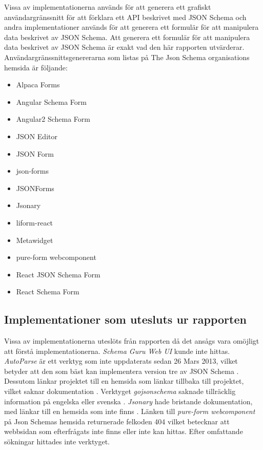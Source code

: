 Vissa av implementationerna används för att generera ett grafiskt användargränssnitt för att förklara ett API beskrivet med JSON Schema och andra implementationer används för att generera ett formulär för att manipulera data beskrivet av JSON Schema. Att generera ett formulär för att manipulera data beskrivet av JSON Schema är exakt vad den här rapporten utvärderar. Användargränssnittsgenererarna som listas på The Json Schema organisations hemsida är följande:

\begin{itemize}
	\item Alpaca Forms \cite{GitanaSoftwareInc.}
	\item Angular Schema Form \cite{Textalk}
	\item Angular2 Schema Form \cite{MakinaCorpus}
	\item JSON Editor \cite{JeremyDorn}
	\item JSON Form \cite{Joshfire}
	\item json-forms \cite{Brutusin.org}
	\item JSONForms  \cite{EclipseSource}
	\item Jsonary \cite{Jsonary-js}
	\item liform-react \cite{NachoMartin}
	\item Metawidget \cite{Metawidget}
	\item pure-form webcomponent
	\item React JSON Schema Form \cite{MozillaServices}
	\item React Schema Form \cite{NetworkNewTechnologiesInc.}
\end{itemize}

\subsection{Implementationer som utesluts ur rapporten}

Vissa av implementationerna uteslöts från rapporten då det ansågs vara omöjligt att förstå implementationerna. \textit{Schema Guru Web UI} kunde inte hittas. \textit{AutoParse} är ett verktyg som inte uppdaterats sedan 26 Mars 2013, vilket betyder att den som bäst kan implementera version tre av JSON Schema \cite{Googleb}. Dessutom länkar projektet till en hemsida som länkar tillbaka till projektet, vilket saknar dokumentation \cite{Googleb}. Verktyget \textit{gojsonschema} saknade tillräcklig information på engelska eller svenska \cite{Zhangtao}. \textit{Jsonary} hade bristande dokumentation, med länkar till en hemsida som inte finns \cite{Jsonary-js}. Länken till \textit{pure-form webcomponent} på Json Schemas hemsida returnerade felkoden 404 vilket betecknar att webbsidan som efterfrågats inte finns eller inte kan hittas. Efter omfattande sökningar hittades inte verktyget.